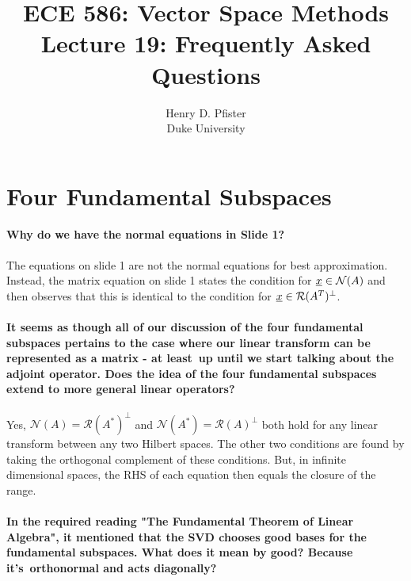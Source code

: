 \documentclass[10pt,english]{article}
\begin{document}
\title{ECE 586: Vector Space Methods \\ Lecture 19: Frequently Asked Questions}
\author{Henry D. Pfister \\ Duke University}

\maketitle

\section{Four Fundamental Subspaces}

\paragraph{Why do we have the normal equations in Slide 1?}

The equations on slide 1 are not the normal equations for best approximation.
Instead, the matrix equation on slide 1 states the condition for $\underline{x} \in \mathcal{N}(A)$ and then observes that this is identical to the condition for $\underline{x} \in \mathcal{R}(A^T)^\perp$.

\paragraph{It seems as though all of our discussion of the four fundamental subspaces pertains to the case where our linear transform can be represented as a matrix - at least up until we start talking about the adjoint operator. Does the idea of the four fundamental subspaces extend to more general linear operators?}

Yes, $\mathcal{N}(A)=\mathcal{R}(A^*)^\perp$ and $\mathcal{N}(A^*)=\mathcal{R}(A)^\perp$ both hold for any linear transform between any two Hilbert spaces.
The other two conditions are found by taking the orthogonal complement of these conditions.
But, in infinite dimensional spaces, the RHS of each equation then equals the closure of the range.


\paragraph{In the required reading "The Fundamental Theorem of Linear Algebra", it mentioned that the SVD chooses good bases for the fundamental subspaces. What does it mean by good? Because it's orthonormal and acts diagonally?}
\end{document}
